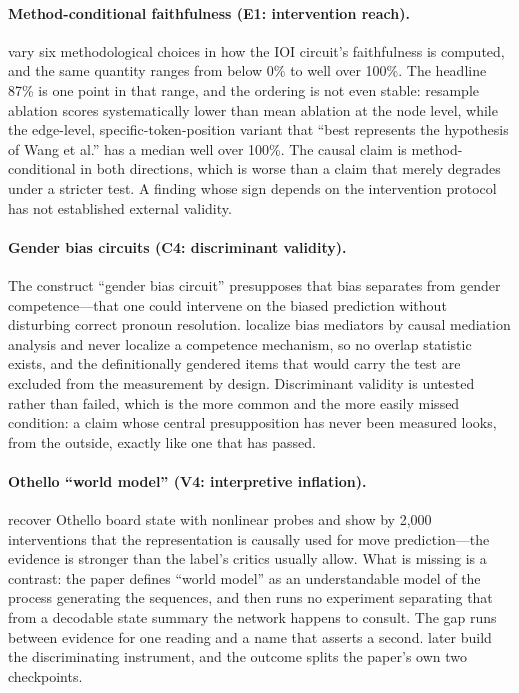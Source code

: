 \documentclass{article}
\begin{document}
\paragraph{Method-conditional faithfulness (E1: intervention reach).}
\citet{miller2024transformer} vary six methodological choices in how the IOI circuit's faithfulness is computed, and the same quantity ranges from below 0\% to well over 100\%. The headline 87\% is one point in that range, and the ordering is not even stable: resample ablation scores systematically lower than mean ablation at the node level, while the edge-level, specific-token-position variant that ``best represents the hypothesis of Wang et al.'' has a median well over 100\%. The causal claim is method-conditional in both directions, which is worse than a claim that merely degrades under a stricter test. A finding whose sign depends on the intervention protocol has not established external validity.

\paragraph{Gender bias circuits (C4: discriminant validity).}
The construct ``gender bias circuit'' presupposes that bias separates from gender competence---that one could intervene on the biased prediction without disturbing correct pronoun resolution. \citet{vig2020gender} localize bias mediators by causal mediation analysis and never localize a competence mechanism, so no overlap statistic exists, and the definitionally gendered items that would carry the test are excluded from the measurement by design. Discriminant validity is untested rather than failed, which is the more common and the more easily missed condition: a claim whose central presupposition has never been measured looks, from the outside, exactly like one that has passed.

\paragraph{Othello ``world model'' (V4: interpretive inflation).}
\citet{li2023othello} recover Othello board state with nonlinear probes and show by 2,000 interventions that the representation is causally used for move prediction---the evidence is stronger than the label's critics usually allow. What is missing is a contrast: the paper defines ``world model'' as an understandable model of the process generating the sequences, and then runs no experiment separating that from a decodable state summary the network happens to consult. The gap runs between evidence for one reading and a name that asserts a second. \citet{vafa2024evaluating} later build the discriminating instrument, and the outcome splits the paper's own two checkpoints.
\end{document}
